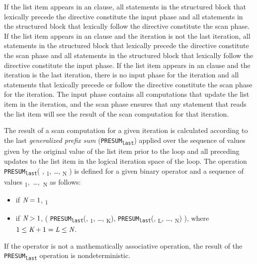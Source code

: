 If the list item appears in an  clause, all statements in the
structured block that lexically precede the directive constitute the input
phase and all statements in the structured block that lexically follow the
directive constitute the scan phase. If the list item appears in an
 clause and the iteration is not the last iteration, all
statements in the structured block that lexically precede the directive
constitute the scan phase and all statements in the structured block that
lexically follow the directive constitute the input phase. If the list item
appears in an  clause and the iteration is the last iteration,
there is no input phase for the iteration and all statements that lexically
precede or follow the directive constitute the scan phase for the iteration.
The input phase contains all computations that update the list item in the
iteration, and the scan phase ensures that any statement that reads the list
item will see the result of the scan computation for that iteration.

The result of a scan computation for a given iteration is calculated according
to the last \textit{generalized prefix sum}
(\texttt{PRESUM\textsubscript{last}}) applied over the sequence of values
given by the original value of the list item prior to the loop and all
preceding updates to the list
item in the logical iteration space of the loop. The operation
\texttt{PRESUM\textsubscript{last}}(
, \textsubscript{1}, \ldots, \textsubscript{N} ) is
defined for a given binary operator  and a sequence of  values
\mbox{\textsubscript{1}, \ldots, \textsubscript{N}} as follows:

\begin{itemize}

\item if $\plc{N} = 1$, \textsubscript{1}

\item if $\plc{N} > 1$, (
    \texttt{PRESUM\textsubscript{last}}(, \textsubscript{1},
    \ldots, \textsubscript{K}), \texttt{PRESUM\textsubscript{last}}(, \textsubscript{L}, \ldots, \textsubscript{N}) ), where $1 \leq \plc{K}+1 = \plc{L} \leq \plc{N}$.
\end{itemize}

If the operator  is not a mathematically associative operation, the result of
the \texttt{PRESUM\textsubscript{last}} operation is nondeterministic.

